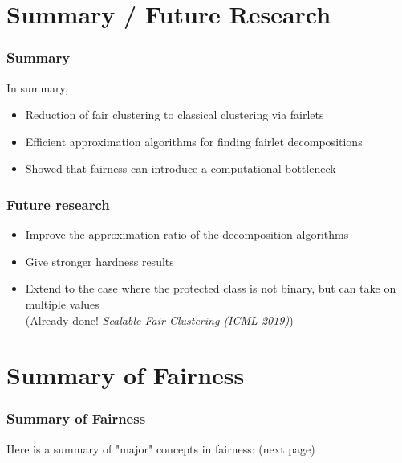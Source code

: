 \documentclass{beamer}
\begin{document}

\section{Summary / Future Research}

\begin{frame}
\frametitle{Summary}

In summary, \pause

\begin{itemize}
	\item Reduction of fair clustering to classical clustering via fairlets \pause

	\item Efficient approximation algorithms for finding fairlet decompositions \pause

	\item Showed that fairness can introduce a computational bottleneck
\end{itemize}

\end{frame}


\begin{frame}
\frametitle{Future research}

\begin{itemize}
	\item Improve the approximation ratio of the decomposition algorithms \pause
	\item Give stronger hardness results \pause
	\item Extend to the case where the protected class is not binary, but can take on multiple values \\
	(Already done! {\it Scalable Fair Clustering (ICML 2019)})
\end{itemize}

\end{frame}


\section{Summary of Fairness}

\begin{frame}
\frametitle{Summary of Fairness}

Here is a summary of "major" concepts in fairness: (next page)

\end{frame}
\end{document}
